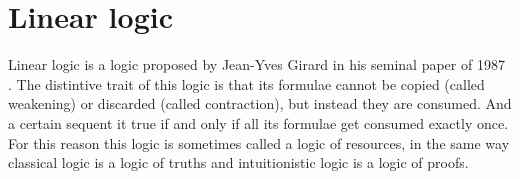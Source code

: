 \documentclass[a4paper, 12pt, tesi, english]{report}
\begin{document}
% 
% 

\section{Linear logic}
Linear logic is a logic proposed by Jean-Yves Girard in his seminal paper of 1987 \cite{LinearLogic}.
The distintive trait of this logic is that its formulae cannot be copied (called weakening) or discarded (called contraction), but instead they are consumed.
And a certain sequent it true if and only if all its formulae get consumed exactly once.
For this reason this logic is sometimes called a logic of resources, in the same way classical logic is a logic of truths and intuitionistic logic is a logic of proofs.
\end{document}
